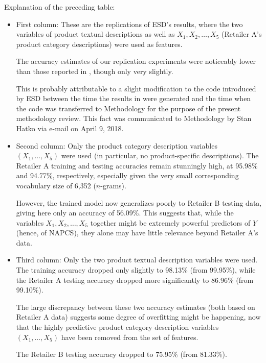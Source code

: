 \vskip 0.5cm
\noindent
Explanation of the preceding table:
\begin{itemize}
\item
	First column:\;\;
	These are the replications of ESD's results, where the two variables of
	product textual descriptions as well as $X_{1}, X_{2}, \ldots , X_{5}$
	(Retailer A's product category descriptions) were used as features.

	\vskip 0.1cm
	The accuracy estimates of our replication experiments were noticeably
	lower than those reported in \cite{Hatko20180302}, though only very
	slightly.

	\vskip 0.1cm
	This is probably attributable to a slight modification to the code introduced
	by ESD between the time the results in \cite{Hatko20180302} were generated
	and the time when the code was transferred to Methodology for the purpose
	of the present methodology review.
	This fact was communicated to Methodology by Stan Hatko via e-mail on
	April 9, 2018.

\item
	Second column:\;\;
	Only the product category description variables $(X_{1}, \ldots ,X_{5})$
	were used (in particular, no product-specific descriptions).
	The Retailer A training and testing accuracies remain stunningly high,
	at 95.98\% and 94.77\%, respectively, especially given the very small
	corresponding vocabulary size of 6,352 ($n$-grams).

	\vskip 0.1cm
	However, the trained model now generalizes poorly to Retailer B testing
	data, giving here only an accuracy of 56.09\%. This suggests that, while
	the variables $X_{1}, X_{2}, \ldots , X_{5}$ together might be extremely
	powerful predictors of $Y$ (hence, of NAPCS), they alone may have little
	relevance beyond Retailer A's data.

\item
	Third column:\;\;
	Only the two product textual description variables were used.
	The training accuracy dropped only slightly to 98.13\% (from 99.95\%),
	while the Retailer A testing accuracy dropped more significantly
	to 86.96\% (from 99.10\%).

	\vskip 0.1cm
	The large discrepancy between these two accuracy estimates (both based on
	Retailer A data) suggests some degree of overfitting might be happening,
	now that the highly predictive product category description variables
	$(X_{1}, \ldots ,X_{5})$ have been removed from the set of features.

	\vskip 0.1cm
	The Retailer B testing accuracy dropped to 75.95\% (from 81.33\%).


\end{itemize}
